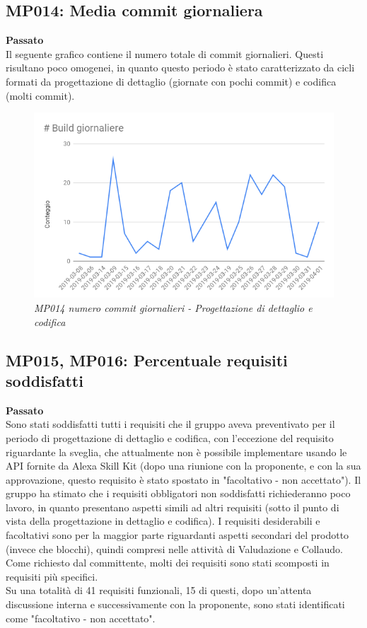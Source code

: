 \subsection{MP014: Media commit giornaliera}
\textbf{Passato}\\
Il seguente grafico contiene il numero totale di commit giornalieri. Questi risultano poco omogenei, in quanto questo periodo è stato caratterizzato da cicli formati da progettazione di dettaglio (giornate con pochi commit) e codifica (molti commit).\\
\begin{figure} [H]
    \centering
	\includegraphics[scale=0.4]{./images/buildsPDC.png}
    \caption{\textit{MP014 numero commit giornalieri - Progettazione di dettaglio e codifica}}
\end{figure}

\subsection{MP015, MP016: Percentuale requisiti soddisfatti}
\textbf{Passato}\\
Sono stati soddisfatti tutti i requisiti che il gruppo aveva preventivato per il periodo di progettazione di dettaglio e codifica, con l'eccezione del requisito riguardante la sveglia, che attualmente non è possibile implementare usando le API fornite da Alexa Skill Kit (dopo una riunione con la proponente, e con la sua approvazione,  questo requisito è stato spostato in "facoltativo - non accettato").
Il gruppo ha stimato che i requisiti obbligatori non soddisfatti richiederanno poco lavoro, in quanto presentano aspetti simili ad altri requisiti (sotto il punto di vista della progettazione in dettaglio e codifica). I requisiti desiderabili e facoltativi sono per la maggior parte riguardanti aspetti secondari del prodotto (invece che blocchi), quindi compresi nelle attività di Valudazione e Collaudo.\\
Come richiesto dal committente, molti dei requisiti sono stati scomposti in requisiti più specifici.\\
Su una totalità di 41 requisiti funzionali, 15 di questi, dopo un'attenta discussione interna e successivamente con la proponente, sono stati identificati come "facoltativo - non accettato".

